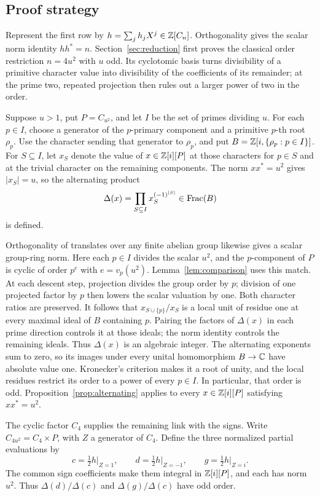 \subsection*{Proof strategy}

Represent the first row by \(h=\sum_jh_jX^j\in\mathbb Z[C_n]\).
Orthogonality gives the scalar norm identity \(hh^*=n\).
Section~\ref{sec:reduction} first proves the classical order
restriction \(n=4u^2\) with \(u\) odd. Its cyclotomic basis turns
divisibility of a primitive character value into divisibility of
the coefficients of its remainder; at the prime two, repeated
projection then rules out a larger power of two in the order.

Suppose \(u>1\), put \(P=C_{u^2}\), and let \(I\) be the set of primes
dividing \(u\). For each \(p\in I\), choose a generator of the
\(p\)-primary component and a primitive \(p\)-th root \(\rho_p\).
Use the character sending that generator to \(\rho_p\), and put
\(B=\mathbb Z[i,\{\rho_p:p\in I\}]\). For \(S\subseteq I\), let \(x_S\)
denote the value of \(x\in\mathbb Z[i][P]\) at those characters for
\(p\in S\) and at the trivial character on the remaining components.
The norm \(xx^*=u^2\) gives \(|x_S|=u\), so the alternating product
\[
 \Delta(x)=\prod_{S\subseteq I}x_S^{(-1)^{|S|}}\in\operatorname{Frac}(B)
\]
is defined.

Orthogonality of translates over any finite abelian group likewise gives
a scalar group-ring norm. Here each \(p\in I\)
divides the scalar \(u^2\), and the \(p\)-component of \(P\) is cyclic
of order \(p^e\) with \(e=v_p(u^2)\). Lemma~\ref{lem:comparison}
uses this match. At each descent step, projection divides the group
order by \(p\); division of one projected factor by \(p\) then lowers
the scalar valuation by one. Both character ratios are preserved.
It follows that
\(x_{S\cup\{p\}}/x_S\) is a local unit of residue one at every maximal
ideal of \(B\) containing \(p\). Pairing the factors of \(\Delta(x)\)
in each prime direction controls it at those ideals; the norm identity
controls the remaining ideals. Thus \(\Delta(x)\) is an algebraic
integer. The alternating exponents sum to zero, so its images under
every unital homomorphism \(B\to\mathbb C\) have absolute value one.
Kronecker's criterion makes it a root of unity, and the local residues
restrict its order to a power of every \(p\in I\). In particular, that
order is odd. Proposition~\ref{prop:alternating} applies to every
\(x\in\mathbb Z[i][P]\) satisfying \(xx^*=u^2\).

The cyclic factor \(C_4\) supplies the remaining link with the signs. Write
\(C_{4u^2}=C_4\times P\), with \(Z\) a generator of \(C_4\).
Define the three normalized partial evaluations by
\[
 c=\tfrac12h\vert_{Z=1},\qquad
 d=\tfrac12h\vert_{Z=-1},\qquad
 g=\tfrac12h\vert_{Z=i}.
\]
The common sign coefficients make them integral in \(\mathbb Z[i][P]\),
and each has norm \(u^2\). Thus
\(\Delta(d)/\Delta(c)\) and \(\Delta(g)/\Delta(c)\) have odd order.

